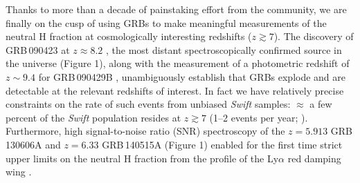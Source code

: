\documentclass[letterpaper,11pt]{article}
\begin{document}
Thanks to more than a decade of painstaking effort from the community, we are finally
on the cusp of using GRBs to make meaningful measurements of the neutral H fraction 
at cosmologically interesting redshifts ($z \gtrsim 7$).  The discovery of 
GRB\,090423 at $z \approx 8.2$ \cite{tfl+09,sdc+09}, the most distant 
spectroscopically confirmed source in the universe (Figure 1), along with the 
measurement of a photometric redshift of $z \sim 9.4$ for GRB\,090429B \cite{clf+11}, 
unambiguously establish that GRBs explode and are detectable at the relevant redshifts 
of interest.  In fact we have relatively precise constraints on the rate of such events from 
unbiased \textit{Swift} samples: $\approx$ a few percent of the \textit{Swift} population 
resides at $z \gtrsim 7$ (1--2 events per year; \cite{pcb+09,gkk+11}).  Furthermore, 
high signal-to-noise ratio (SNR) spectroscopy of the $z = 5.913$ GRB\,130606A 
and $z = 6.33$ GRB\,140515A (Figure 1) enabled for the first time strict upper limits 
on the neutral H fraction from the profile of the Ly$\alpha$ red damping wing 
\cite{cbf+13,hmf+14,cse+13,cbf+14}.
\end{document}
